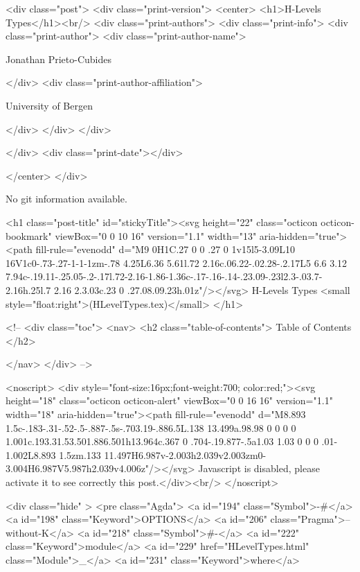 <div class="post">
  <div class="print-version">
    <center>
      <h1>H-Levels Types</h1><br/>
        <div class="print-authors">
          <div class="print-info">
            <div class="print-author">
              <div class="print-author-name">
                
                  Jonathan Prieto-Cubides
                
              </div>
              <div class="print-author-affiliation">
                
                  University of Bergen
                
                </div>
            </div>
          </div>
          
          
        </div>
        <div class="print-date"></div>
        
        
    </center>
  </div>

  
  No git information available.
  

  <h1 class="post-title" id="stickyTitle"><svg height="22" class="octicon octicon-bookmark" viewBox="0 0 10 16" version="1.1" width="13" aria-hidden="true"><path fill-rule="evenodd" d="M9 0H1C.27 0 0 .27 0 1v15l5-3.09L10 16V1c0-.73-.27-1-1-1zm-.78 4.25L6.36 5.61l.72 2.16c.06.22-.02.28-.2.17L5 6.6 3.12 7.94c-.19.11-.25.05-.2-.17l.72-2.16-1.86-1.36c-.17-.16-.14-.23.09-.23l2.3-.03.7-2.16h.25l.7 2.16 2.3.03c.23 0 .27.08.09.23h.01z"/></svg> H-Levels Types <small style="float:right">(HLevelTypes.tex)</small>
  </h1>

  <!-- 
  <div class="toc">
    <nav>
    <h2 class="table-of-contents"> Table of Contents </h2>
      

    </nav>
  </div>
   -->

  <noscript>
  <div style="font-size:16px;font-weight:700; color:red;"><svg height="18" class="octicon octicon-alert" viewBox="0 0 16 16" version="1.1" width="18" aria-hidden="true"><path fill-rule="evenodd" d="M8.893 1.5c-.183-.31-.52-.5-.887-.5s-.703.19-.886.5L.138 13.499a.98.98 0 0 0 0 1.001c.193.31.53.501.886.501h13.964c.367 0 .704-.19.877-.5a1.03 1.03 0 0 0 .01-1.002L8.893 1.5zm.133 11.497H6.987v-2.003h2.039v2.003zm0-3.004H6.987V5.987h2.039v4.006z"/></svg> Javascript is disabled, please activate it to see correctly this post.</div><br/>
  </noscript>

  <div class="hide" >
<pre class="Agda">
<a id="194" class="Symbol">{-#</a> <a id="198" class="Keyword">OPTIONS</a> <a id="206" class="Pragma">--without-K</a> <a id="218" class="Symbol">#-}</a>
<a id="222" class="Keyword">module</a> <a id="229" href="HLevelTypes.html" class="Module">_</a> <a id="231" class="Keyword">where</a>

